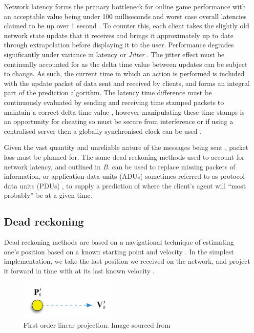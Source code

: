 \documentclass[journal]{IEEEtran}
\begin{document}
Network latency forms the primary bottleneck for online game performance with an acceptable value being under 100 milliseconds \cite{lee2015outatime} \cite{smed2002aspects} and worst case overall latencies claimed to be up over 1 second \cite{claypool2006latency}. To counter this, each client takes the slightly old network state update that it receives and brings it approximately up to date through extrapolation before displaying it to the user. Performance degrades significantly under variance in latency or \textit{Jitter} \cite{beigbeder2004effects} \cite{dick2005analysis}. The jitter effect must be continually accounted for as the delta time value between updates can be subject to change. As such, the current time in which an action is performed is included with the update packet of data sent and received by clients, and forms an integral part of the prediction algorithm. The latency time difference must be continuously evaluated by sending and receiving time stamped packets to maintain a correct delta time value \cite{glazer2015multiplayer}, however manipulating these time stamps is an opportunity for cheating \cite{jamin2003cheat} so must be secure from interference or if using a centralised server then a globally synchronised clock can be used \cite{aggarwal2004accuracy}.

Given the vast quantity and unreliable nature of the messages being sent \cite{cronin2001distributed}, packet loss must be planned for. The same dead reckoning methods used to account for network latency, and outlined in \textit{B.} can be used to replace missing packets of information, or application data units (ADUs) \cite{diot1999distributed} sometimes referred to as protocol data units (PDUs) \cite{dis1998ieee}, to supply a prediction of where the client's agent will ``most probably'' be at a given time.

\subsection{Dead reckoning} \label{deadReckoning}

Dead reckoning methods are based on a navigational technique of estimating one’s position based on a known starting point and velocity \cite{smed2002aspects}. In the simplest implementation, we take the last position we received on the network, and project it forward in time with at its last known velocity \cite{murphy2011believable}.

\begin{figure}[h]
    \centering
    \includegraphics[width=0.3\linewidth]{DR1.png}
    \caption{First order linear projection. Image sourced from \cite{murphy2011believable}}
    \label{fig:dr1}
\end{figure}
\end{document}

